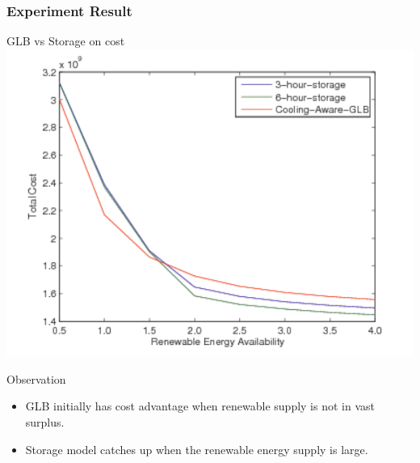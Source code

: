 \documentclass[xcolor=dvipsnames]{beamer}
\begin{document}
\begin{frame}
\frametitle{Experiment Result}
\begin{block}
{GLB vs Storage on cost}
\includegraphics[scale = 0.38]{cost_storage.pdf}
\end{block}
\begin{block}
{Observation}
\begin{itemize}
\item
GLB initially has cost advantage when renewable supply is not in vast surplus.
\item
Storage model catches up when the renewable energy supply is large.
\end{itemize}
\end{block}
\end{frame}
%
%
\end{document}
